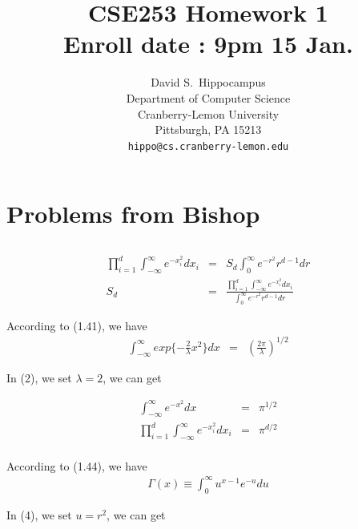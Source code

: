\documentclass{article} %
\title{CSE253 Homework 1  \\ Enroll date : 9pm 15 Jan. }
\author{
David S.~Hippocampus\\
Department of Computer Science\\
Cranberry-Lemon University\\
Pittsburgh, PA 15213 \\
\texttt{hippo@cs.cranberry-lemon.edu}
}
\begin{document}
\maketitle


\section{Problems from Bishop}


\subsection{}

\begin{equation}
    \begin{array}{rcl}
        \prod\limits_{i = 1}^{d}\int_{-\infty}^{\infty}e^{-x_i^2} d x_i& = & S_d\int_{0}^{\infty}e^{-r^2}r^{d-1}dr\\
                S_d  & = & \frac{\prod\limits_{i = 1}^{d}\int_{-\infty}^{\infty}e^{-x_i^2} d x_i}{\int_{0}^{\infty}e^{-r^2}r^{d-1}dr}
    \end{array}
\end{equation}

According to (1.41),  we have
\begin{equation}
    \begin{array}{rcl}
       \int_{-\infty}^{\infty} exp\{-\frac{2}{\lambda}x^2\} dx  & =  & (\frac{2\pi}{\lambda})^{1/2}
    \end{array}
\end{equation}

In (2), we set $\lambda = 2$, we can get

\begin{equation}
    \begin{array}{rcl}
       \int_{-\infty}^{\infty} e^{-x^2} dx  & =  & \pi^{1/2} \\
        \prod\limits_{i = 1}^{d}\int_{-\infty}^{\infty}e^{-x_i^2} d x_i& = & \pi^{d/2} \\
    \end{array}
\end{equation}

According to (1.44),  we have
\begin{equation}
    \begin{array}{rcl}
      	\Gamma(x) \equiv \int_{0}^{\infty}u^{x-1}e^{-u} du
    \end{array}
\end{equation}

In (4), we set $u = r^2$, we can get
\end{document}
